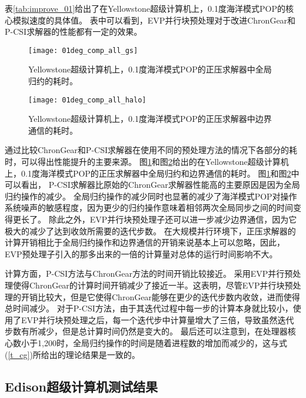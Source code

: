 表\ref{tab:improve_01}给出了在Yellowstone超级计算机上，0.1度海洋模式POP的核心模拟速度的具体值。
表中可以看到，EVP并行块预处理对于改进ChronGear和P-CSI求解器的性能都有一定的效果。


\begin {figure}[!ht]
\begin{center}
\texttt{[image: 01deg\_comp\_all\_gs]}
\end{center}
\caption[] {Yellowstone超级计算机上，0.1度海洋模式POP的正压求解器中全局归约的耗时。}
\label{fig:component_gs}
\end {figure}

\begin {figure}[!ht]
\begin{center}
\texttt{[image: 01deg\_comp\_all\_halo]}
\end{center}
\caption[] {Yellowstone超级计算机上，0.1度海洋模式POP的正压求解器中边界通信的耗时。}
\label{fig:component_halo}
\end {figure}
通过比较ChronGear和P-CSI求解器在使用不同的预处理方法的情况下各部分的耗时，可以得出性能提升的主要来源。 
图\ref{fig:component_gs}和图\ref{fig:component_halo}给出的在Yellowstone超级计算机上，0.1度海洋模式POP的正压求解器中全局归约和边界通信的耗时。 
图\ref{fig:component_gs}和图\ref{fig:component_halo}中可以看出， P-CSI求解器比原始的ChronGear求解器性能高的主要原因是因为全局归约操作的减少。 
全局归约操作的减少同时也显著的减少了海洋模式POP对操作系统噪声的敏感程度\cite{ferreira}，因为更少的归约操作意味着相邻两次全局同步之间的时间变得更长了。 
除此之外，EVP并行块预处理子还可以进一步减少边界通信，因为它极大的减少了达到收敛所需要的迭代步数。 
在大规模并行环境下，正压求解器的计算开销相比于全局归约操作和边界通信的开销来说基本上可以忽略，因此，EVP预处理子引入的那多出来的一倍的计算量对总体的运行时间影响不大。


计算方面，P-CSI方法与ChronGear方法的时间开销比较接近。 
采用EVP并行预处理使得ChronGear的计算时间开销减少了接近一半。这表明，尽管EVP并行块预处理的开销比较大，但是它使得ChronGear能够在更少的迭代步数内收敛，进而使得总时间减少。 
对于P-CSI方法，由于其迭代过程中每一步的计算本身就比较小，使用了EVP并行块预处理之后，每一个迭代步中计算量增大了三倍，导致虽然迭代步数有所减少，但是总计算时间仍然是变大的。
最后还可以注意到，在处理器核心数小于1,200时，全局归约操作的时间是随着进程数的增加而减少的，这与式(\ref{t_cg})所给出的理论结果是一致的。

\subsection{Edison超级计算机测试结果}
\label{precond:exp:Edison}

